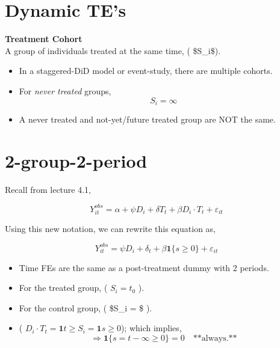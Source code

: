 \documentclass[
  letterpaper,
  DIV=11,
  numbers=noendperiod]{scrreprt}
\providecommand{\tightlist}{%
  \setlength{\itemsep}{0pt}\setlength{\parskip}{0pt}}\usepackage{longtable,booktabs,array}
\theoremstyle{definition}
\theoremstyle{remark}
\begin{document}
\hypertarget{dynamic-tes-1}{%
\section{Dynamic TE's}\label{dynamic-tes-1}}

\begin{tcolorbox}[enhanced jigsaw, breakable, colframe=quarto-callout-note-color-frame, toptitle=1mm, toprule=.15mm, opacitybacktitle=0.6, opacityback=0, rightrule=.15mm, titlerule=0mm, colback=white, bottomtitle=1mm, title={Note}, arc=.35mm, coltitle=black, colbacktitle=quarto-callout-note-color!10!white, leftrule=.75mm, bottomrule=.15mm, left=2mm]

\textbf{Treatment Cohort}\\
A group of individuals treated at the same time, ( \$S\_i\$).

\end{tcolorbox}

\begin{itemize}
\tightlist
\item
  In a staggered-DiD model or event-study, there are multiple cohorts.
\item
  For \emph{never treated} groups, \[
  S_i = \infty
  \]
\item
  A never treated and not-yet/future treated group are NOT the same.
\end{itemize}

\hypertarget{group-2-period}{%
\section{2-group-2-period}\label{group-2-period}}

Recall from lecture 4.1,

\[
Y^{obs}_{it} = \alpha + \psi D_i + \delta T_t + \beta D_i \cdot T_t + \varepsilon_{it}
\]

Using this new notation, we can rewrite this equation as,

\[
Y^{obs}_{it} = \psi D_i + \delta_t + \beta \mathbf{1}\{s \geq 0\} + \varepsilon_{it}
\]

\begin{itemize}
\tightlist
\item
  Time FEs are the same as a post-treatment dummy with 2 periods.
\item
  For the treated group, ( \(S_i = t_0\) ).
\item
  For the control group, ( \$S\_i = \infty \$ ).
\item
  ( \(D_i \cdot T_t = \mathbf{1}{t \geq S_i} = \mathbf{1}{s \geq 0}\));
  which implies, \[
  \Rightarrow \mathbf{1}\{s = t - \infty \geq 0\} = 0 \quad \text{**always.**}
  \]
\end{itemize}
\end{document}
